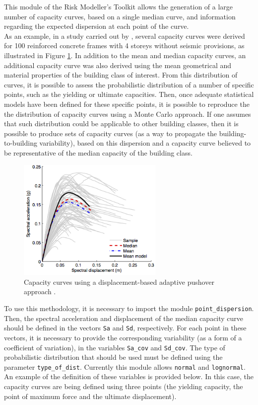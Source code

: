 This module of the Risk Modeller's Toolkit allows the generation of a large number of capacity curves, based on a single median curve, and information regarding the expected dispersion at each point of the curve. \\

As an example, in a study carried out by \cite{SilvaEtAl2014b}, several capacity curves were derived for 100 reinforced concrete frames with 4 storeys without seismic provisions, as illustrated in Figure \ref{fig:set_cc}. In addition to the mean and median capacity curves, an additional capacity curve was also derived using the mean geometrical and material properties of the building class of interest. From this distribution of curves, it is possible to assess the probabilistic distribution of a number of specific points, such as the yielding or ultimate capacities. Then, once adequate statistical models have been defined for these specific points, it is possible to reproduce the the distribution of capacity curves using a Monte Carlo approach. If one assumes that such distribution could be applicable to other building classes, then it is possible to produce sets of capacity curves (as a way to propagate the building-to-building variability), based on this dispersion and a capacity curve believed to be representative of the median capacity of the building class.

\begin{figure}[htb]
  \centering
      \includegraphics[width=7cm]{figures/set_capacity_curves.png}
  \caption{Capacity curves using a displacement-based adaptive pushover approach \citep{SilvaEtAl2014b}.}
  \label{fig:set_cc}
\end{figure}

To use this methodology, it is necessary to import the module \verb=point_dispersion=. Then, the spectral acceleration and displacement of the median capacity curve should be defined in the vectors \verb=Sa= and \verb=Sd=, respectively. For each point in these vectors, it is necessary to provide the corresponding variability (as a form of a coefficient of variation), in the variables \verb=Sa_cov= and \verb=Sd_cov=. The type of probabilistic distribution that should be used must be defined using the parameter \verb=type_of_dist=. Currently this module allows \verb=normal= and \verb=lognormal=. An example of the definition of these variables is provided below. In this case, the capacity curves are being defined using three points (the yielding capacity, the point of maximum force and the ultimate displacement).

